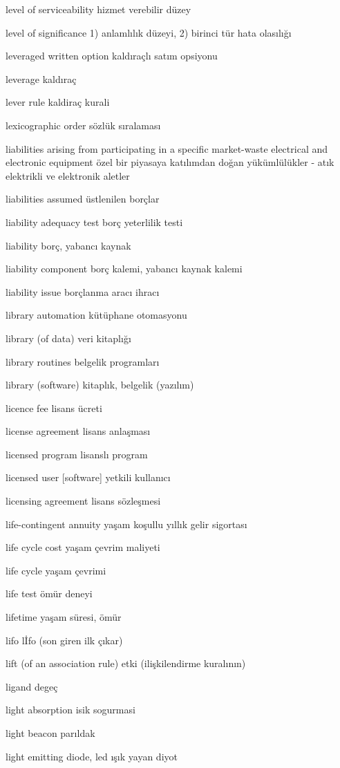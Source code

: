 \documentclass[12pt,fleqn]{article}\usepackage{../../common}
\begin{document}
level of serviceability hizmet verebilir düzey

level of significance 1) anlamlılık düzeyi, 2) birinci tür hata olasılığı

leveraged written option kaldıraçlı satım opsiyonu

leverage kaldıraç

lever rule kaldiraç kurali

lexicographic order sözlük sıralaması

liabilities arising from participating in a specific market-waste electrical and electronic equipment özel bir piyasaya katılımdan doğan yükümlülükler - atık elektrikli ve elektronik aletler

liabilities assumed üstlenilen borçlar

liability adequacy test borç yeterlilik testi

liability borç, yabancı kaynak

liability component borç kalemi, yabancı kaynak kalemi

liability issue borçlanma aracı ihracı

library automation kütüphane otomasyonu

library (of data) veri kitaplığı

library routines belgelik programları

library (software) kitaplık, belgelik (yazılım)

licence fee lisans ücreti

license agreement lisans anlaşması

licensed program lisanslı program

licensed user [software] yetkili kullanıcı

licensing agreement lisans sözleşmesi

life-contingent annuity yaşam koşullu yıllık gelir sigortası

life cycle cost yaşam çevrim maliyeti

life cycle yaşam çevrimi

life test ömür deneyi

lifetime yaşam süresi, ömür

lifo lİfo (son giren ilk çıkar)

lift (of an association rule) etki (ilişkilendirme kuralının)

ligand degeç

light absorption isik sogurmasi

light beacon parıldak

light emitting diode, led ışık yayan diyot
\end{document}
